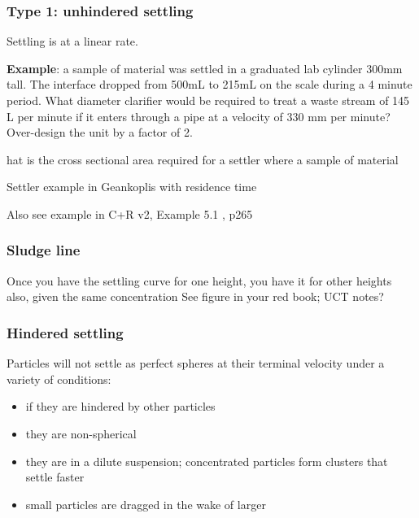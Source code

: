 \begin{frame}\frametitle{Type 1: unhindered settling}
	Settling is at a linear rate.
	
	\vspace{12pt}
	
	\textbf{Example}: a sample of material was settled in a graduated lab cylinder 300mm tall. The interface dropped from 500mL to 215mL on the scale during a 4 minute period. What diameter clarifier would be required to treat a waste stream of 145 L per minute if it enters through a pipe at a velocity of 330 mm per minute? 	
	Over-design the unit by a factor of 2.
	
	
	
	hat is the cross sectional area required for a settler where a sample of material
	
	Settler example in Geankoplis with residence time 

	Also see example in C+R v2, Example 5.1 , p265
	
	
\end{frame}

\begin{frame}\frametitle{Sludge line}
	Once you have the settling curve for one height, you have it for other heights also, given the same concentration
	See figure in your red book; UCT notes?
	
\end{frame}

\begin{frame}\frametitle{Hindered settling}
	Particles will not settle as perfect spheres at their terminal velocity under a variety of conditions:
	\begin{itemize}
		\item	if they are hindered by other particles
		\item	they are non-spherical
		\item	they are in a dilute suspension; concentrated particles form clusters that settle faster
		\item	small particles are dragged in the wake of larger
	\end{itemize}
\end{frame}

